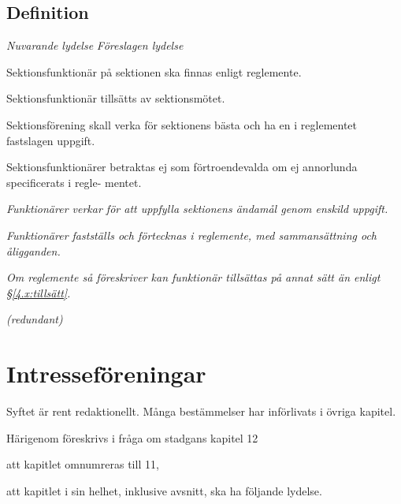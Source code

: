 \documentclass{article}
\newenvironment{lydelse}
    {\begin{paracol}{2}%
        \emph{Nuvarande lydelse}%
        \switchcolumn%
        \emph{Föreslagen lydelse}%
    \end{paracol}%
    \begin{enumerate}[label=\thesubsection.\arabic*]%
    \begin{paracol}{2}%
    }{\end{paracol}\end{enumerate}}
\begin{document}
\subsection{Definition}
\begin{lydelse}
  \setcounter{section}{11}
  \setcounter{subsection}{1}
\item Sektionsfunktionär på sektionen ska finnas enligt reglemente.
\item Sektionsfunktionär tillsätts av sektionsmötet.
\item Sektionsförening skall verka för sektionens bästa och ha en i reglementet fastslagen uppgift.
\item Sektionsfunktionärer betraktas ej som förtroendevalda om ej annorlunda specificerats i regle-
mentet.
\switchcolumn
\setcounter{section}{10}
\item \emph{Funktionärer verkar för att uppfylla sektionens ändamål genom enskild uppgift.}
\item \emph{Funktionärer fastställs och förtecknas i reglemente, med sammansättning och åligganden.}
\item \emph{Om reglemente så föreskriver kan funktionär tillsättas på annat sätt än enligt \S\ref{4.x:tillsätt}.}
\item[] \emph{(redundant)}
\end{lydelse}
\setcounter{section}{10}

\section{Intresseföreningar}
Syftet är rent redaktionellt.
Många bestämmelser har införlivats i övriga kapitel.

Härigenom föreskrivs i fråga om stadgans kapitel 12
\begin{dels}
\item att kapitlet omnumreras till 11,
\item att kapitlet i sin helhet, inklusive avsnitt, ska ha följande lydelse.
\end{dels}
\end{document}
